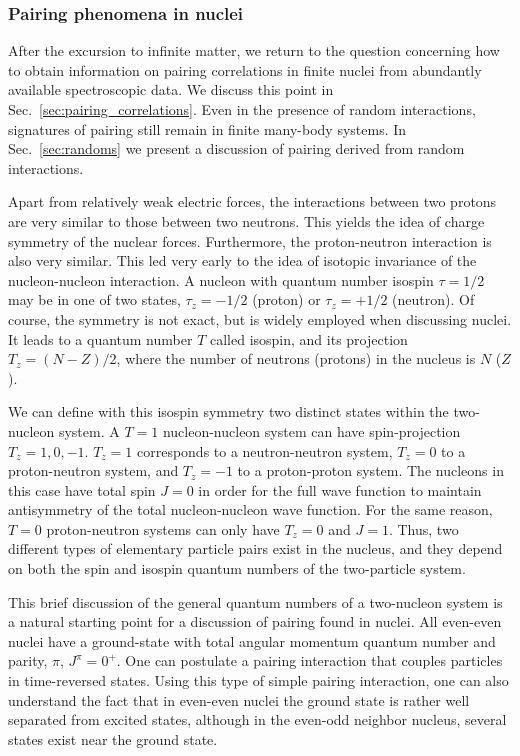 \documentclass[rmp,aps,floatfix]{revtex4}
\begin{document}
\subsubsection{Pairing phenomena in nuclei}
\label{subsubsec:phenomena}

After the excursion to infinite matter, 
we return to the question concerning how to obtain 
information on pairing correlations in finite nuclei from 
abundantly available spectroscopic data.
We discuss this point in Sec.~\ref{sec:pairing_correlations}. 
Even in the presence of random interactions, 
signatures of pairing still remain in finite many-body 
systems.  In Sec.~\ref{sec:randoms} we present a discussion
of pairing derived from random interactions.

Apart from relatively weak electric forces, the interactions
between two protons are very similar to those between two neutrons. 
This yields the idea of charge symmetry of the nuclear forces. 
Furthermore, the proton-neutron interaction is also very similar. 
This led very early to the idea of isotopic invariance of the
nucleon-nucleon interaction. A nucleon with quantum number isospin $\tau=1/2$
may be in one of two states, $\tau_z=-1/2$ (proton) or $\tau_z=+1/2$ (neutron).
Of course, the symmetry is not exact, but is widely employed when 
discussing nuclei. It leads to a quantum number $T$ called isospin, and 
its projection $T_z=(N-Z)/2$, where the number of neutrons (protons) in 
the nucleus is $N$ ($Z$). 

We can define with this isospin symmetry two distinct states within the
two-nucleon system. A $T=1$ nucleon-nucleon system can have spin-projection
$T_z=1,0,-1$. $T_z=1$ corresponds to a neutron-neutron system, $T_z=0$ to 
a proton-neutron system, and $T_z=-1$ to a proton-proton system. The nucleons
in this case have total spin $J=0$ in order for the full wave function to 
maintain antisymmetry of the total nucleon-nucleon wave function. For the
same reason, $T=0$ proton-neutron systems can only have $T_z=0$ and $J=1$.
Thus, two different types of elementary particle pairs exist in the 
nucleus, and they
depend on both the spin and isospin quantum numbers of the two-particle system. 

This brief discussion of the general quantum numbers of a two-nucleon system
is a natural starting point for a discussion
of pairing found in nuclei. All even-even nuclei have a ground-state 
with total angular momentum quantum number and parity, $\pi$, $J^\pi=0^+$. 
One can postulate a pairing interaction that couples particles 
in time-reversed states.  Using this type of simple pairing 
interaction, one can also understand the fact that in even-even 
nuclei the ground state is rather well separated from excited 
states, although in the even-odd neighbor nucleus, several states 
exist near the ground state. 
\end{document}

